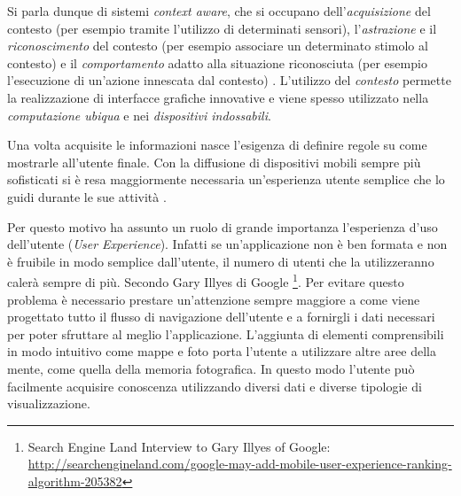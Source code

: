 Si parla dunque di sistemi \emph{context aware}, che si occupano dell'\emph{acquisizione} del contesto (per esempio tramite l'utilizzo di determinati sensori), l'\emph{astrazione} e il \emph{riconoscimento} del contesto (per esempio associare un determinato stimolo al contesto) e il \emph{comportamento} adatto alla situazione riconosciuta (per esempio l'esecuzione di un'azione innescata dal contesto) \cite{schmidt2003ubiquitous}. L'utilizzo del \emph{contesto} permette la realizzazione di interfacce grafiche innovative e viene spesso utilizzato nella \emph{computazione ubiqua} e nei \emph{dispositivi indossabili}.


Una volta acquisite le informazioni nasce l'esigenza di definire regole su come mostrarle all'utente finale. Con la diffusione di dispositivi mobili sempre più sofisticati si è resa maggiormente necessaria un'esperienza utente semplice che lo guidi durante le sue attività .


Per questo motivo ha assunto un ruolo di grande importanza l'esperienza d'uso dell'utente (\emph{User Experience}). Infatti se un'applicazione non è ben formata e non è fruibile in modo semplice dall'utente, il numero di utenti che la utilizzeranno calerà sempre di più. Secondo Gary Illyes di Google \footnote{Search Engine Land Interview to Gary Illyes of Google: \url{http://searchengineland.com/google-may-add-mobile-user-experience-ranking-algorithm-205382}}. Per evitare questo problema è necessario prestare un'attenzione sempre maggiore a come viene progettato tutto il flusso di navigazione dell'utente e a fornirgli i dati necessari per poter sfruttare al meglio l'applicazione. L'aggiunta di elementi comprensibili in modo intuitivo come mappe e foto porta l'utente a utilizzare altre aree della mente, come quella della memoria fotografica. In questo modo l'utente può facilmente acquisire conoscenza utilizzando diversi dati e diverse tipologie di visualizzazione.


